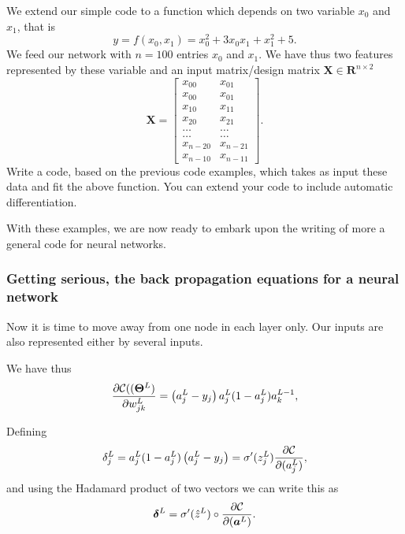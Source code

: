 \documentclass{beamer}
\newenvironment{doconceexercise}{}{}
\newcounter{doconceexercisecounter}
\newcounter{doconce:movie:counter}
\begin{document}
\begin{frame}

\begin{doconceexercise}

                             

We extend our simple code to a function which depends on two variable $x_0$ and $x_1$, that is
\[
y=f(x_0,x_1)=x_0^2+3x_0x_1+x_1^2+5.
\]
We feed our network with $n=100$ entries $x_0$ and $x_1$. We have thus two features represented by these variable and an input matrix/design matrix $\bm{X}\in \mathbf{R}^{n\times 2}$
\[
\bm{X}=\begin{bmatrix} x_{00} & x_{01} \\ x_{00} & x_{01} \\ x_{10} & x_{11} \\ x_{20} & x_{21} \\ \dots & \dots \\ \dots & \dots \\ x_{n-20} & x_{n-21} \\ x_{n-10} & x_{n-11} \end{bmatrix}.
\]
Write a code, based on the previous code examples, which takes as input these data and fit the above function.
You can extend your code to include automatic differentiation.

With these examples, we are now ready to embark upon the writing of more a general code for neural networks.

\end{doconceexercise}
\end{frame}

\begin{frame}
\frametitle{Getting serious, the  back propagation equations for a neural network}

Now it is time to move away from one node in each layer only. Our inputs are also represented either by several inputs.

We have thus
\[
\frac{\partial{\cal C}((\bm{\Theta}^L)}{\partial w_{jk}^L}  =  \left(a_j^L - y_j\right)a_j^L(1-a_j^L)a_k^{L-1}, 
\]

Defining
\[
\delta_j^L = a_j^L(1-a_j^L)\left(a_j^L - y_j\right) = \sigma'(z_j^L)\frac{\partial {\cal C}}{\partial (a_j^L)},
\]
and using the Hadamard product of two vectors we can write this as
\[
\bm{\delta}^L = \sigma'(\hat{z}^L)\circ\frac{\partial {\cal C}}{\partial (\bm{a}^L)}.
\]
\end{frame}
\end{document}
